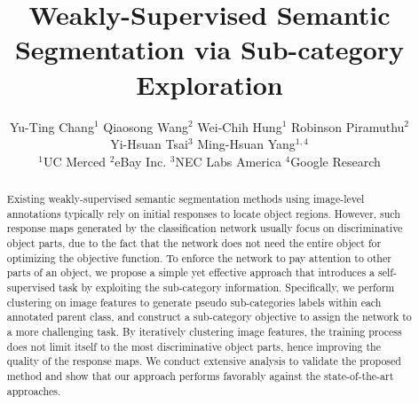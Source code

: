 \documentclass[10pt,twocolumn,letterpaper]{article}
\begin{document}
\title{Weakly-Supervised Semantic Segmentation via Sub-category Exploration}





\author{
		Yu-Ting Chang$^{1}$
		\hspace{0.15in} Qiaosong Wang$^2$
		\hspace{0.15in} Wei-Chih Hung$^1$ 
		\hspace{0.15in} Robinson  Piramuthu$^2$\\
		\hspace{0.15in} Yi-Hsuan Tsai$^3$
		\hspace{0.15in} Ming-Hsuan Yang$^{1,4}$
		\vspace{1mm}\\
		$^1$UC Merced \hspace{0.15in} $^2$eBay Inc.\hspace{0.15in} $^3$NEC Labs America \hspace{0.15in} $^4$Google Research
	}


\maketitle


\begin{abstract}
Existing weakly-supervised semantic segmentation methods using image-level annotations typically rely on initial responses to locate object regions.
However, such response maps generated by the classification network usually focus on discriminative object parts, due to the fact that the network does not need the entire object for optimizing the objective function.
To enforce the network to pay attention to other parts of an object, we propose a simple yet effective approach that introduces a self-supervised task by exploiting the sub-category information.
Specifically, we perform clustering on image features to generate pseudo sub-categories labels within each annotated parent class, and construct a sub-category objective to assign the network to a more challenging task.
By iteratively clustering image features, the training process does not limit itself to the most discriminative object parts, hence improving the quality of the response maps.
We conduct extensive analysis to validate the proposed method and show that our approach performs favorably against the state-of-the-art approaches.




\end{abstract}
\end{document}
